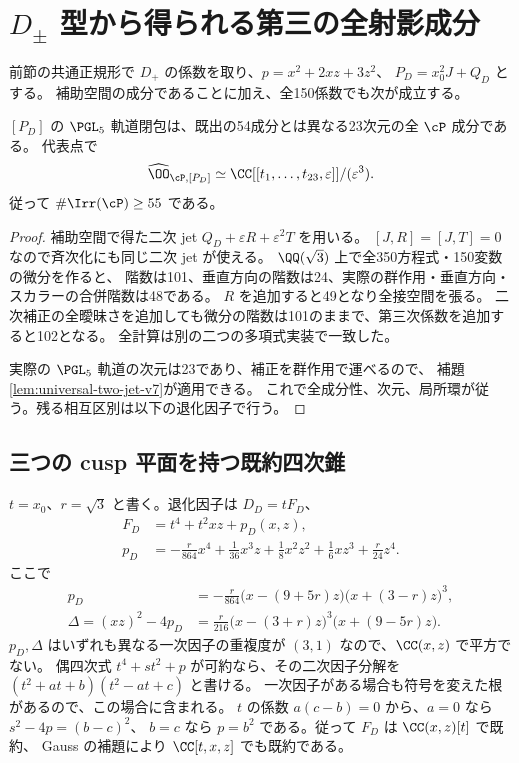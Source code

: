 \section{\texorpdfstring{$D_\pm$}{D±} 型から得られる第三の全射影成分}\label{sec:dplus-full}
前節の共通正規形で $D_+$ の係数を取り、$p=x^2+2xz+3z^2$、
$P_D=x_0^2J+Q_D$ とする。
補助空間の成分であることに加え、全150係数でも次が成立する。

\begin{theorem}\label{thm:dplus-full}
$[P_D]$ の $\PGL_5$ 軌道閉包は、既出の54成分とは異なる23次元の全 $\cP$ 成分である。
代表点で
\[
 \widehat\OO_{\cP,[P_D]}
       \simeq\CC[[t_1,\ldots,t_{23},\varepsilon]]/(\varepsilon^3).
\]
従って $\#\Irr(\cP)\ge55$ である。
\end{theorem}
\begin{proof}
補助空間で得た二次 jet $Q_D+\varepsilon R+\varepsilon^2T$ を用いる。
$[J,R]=[J,T]=0$ なので斉次化にも同じ二次 jet が使える。
$\QQ(\sqrt3)$ 上で全350方程式・150変数の微分を作ると、
階数は101、垂直方向の階数は24、実際の群作用・垂直方向・スカラーの合併階数は48である。
$R$ を追加すると49となり全接空間を張る。
二次補正の全曖昧さを追加しても微分の階数は101のままで、第三次係数を追加すると102となる。
全計算は別の二つの多項式実装で一致した。

実際の $\PGL_5$ 軌道の次元は23であり、補正を群作用で運べるので、
補題\ref{lem:universal-two-jet-v7}が適用できる。
これで全成分性、次元、局所環が従う。残る相互区別は以下の退化因子で行う。
\end{proof}

\subsection{三つの cusp 平面を持つ既約四次錐}
$t=x_0$、$r=\sqrt3$ と書く。退化因子は $D_D=tF_D$、
\begin{align*}
 F_D&=t^4+t^2xz+p_D(x,z),\\
 p_D&=-\frac r{864}x^4+\frac1{36}x^3z+\frac18x^2z^2
           +\frac16xz^3+\frac r{24}z^4.
\end{align*}
ここで
\begin{align*}
 p_D&=-\frac r{864}\bigl(x-(9+5r)z\bigr)
                         \bigl(x+(3-r)z\bigr)^3,\\
 \Delta=(xz)^2-4p_D&=\frac r{216}\bigl(x-(3+r)z\bigr)^3
                              \bigl(x+(9-5r)z\bigr).
\end{align*}
$p_D,\Delta$ はいずれも異なる一次因子の重複度が $(3,1)$ なので、$\CC(x,z)$ で平方でない。
偶四次式 $t^4+st^2+p$ が可約なら、その二次因子分解を
$(t^2+at+b)(t^2-at+c)$ と書ける。
一次因子がある場合も符号を変えた根があるので、この場合に含まれる。
$t$ の係数 $a(c-b)=0$ から、$a=0$ なら $s^2-4p=(b-c)^2$、
$b=c$ なら $p=b^2$ である。従って $F_D$ は $\CC(x,z)[t]$ で既約、
Gauss の補題により $\CC[t,x,z]$ でも既約である。

